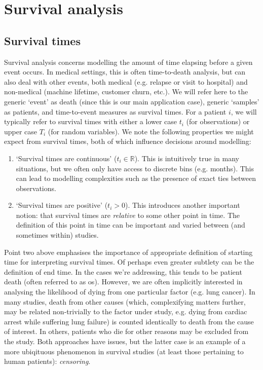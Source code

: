 \documentclass[../thesis.tex]{subfiles}
\begin{document}
\section{Survival analysis \label{sec:survival}}

\subsection{Survival times}

Survival analysis concerns modelling the amount of time elapsing before a given event occurs. In medical settings, this is often time-to-death analysis, but can also deal with other events, both medical (e.g. relapse or visit to hospital) and non-medical (machine lifetime, customer churn, etc.). We will refer here to the generic `event' as death (since this is our main application case), generic `samples' as patients, and time-to-event measures as survival times. For a patient $i$, we will typically refer to survival times with either a lower case $t_i$ (for observations) or upper case $T_i$ (for random variables). We note the following properties we might expect from survival times, both of which influence decisions around modelling:
\begin{enumerate}
    \item `Survival times are continuous' ($t_i \in \mathbb{R}$). This is intuitively true in many situations, but we often only have access to discrete bins (e.g. months). This can lead to modelling complexities such as the presence of exact ties between observations.
    \item `Survival times are positive' ($t_i > 0$). This introduces another important notion: that survival times are \emph{relative} to some other point in time. The definition of this point in time can be important and varied between (and sometimes within) studies.
\end{enumerate}
Point two above emphasises the importance of appropriate definition of starting time for interpreting survival times. Of perhaps even greater subtlety can be the definition of end time. In the cases we're addressing, this tends to be patient death (often referred to as \gls{os}). However, we are often implicitly interested in analysing the likelihood of dying from one particular factor (e.g. lung cancer). In many studies, death from other causes (which, complexifying matters further, may be related non-trivially to the factor under study, e.g. dying from cardiac arrest while suffering lung failure) is counted identically to death from the cause of interest. In others, patients who die for other reasons may be excluded from the study. Both approaches have issues, but the latter case is an example of a more ubiqituous phenomenon in survival studies (at least those pertaining to human patients): \emph{censoring}.
\end{document}
